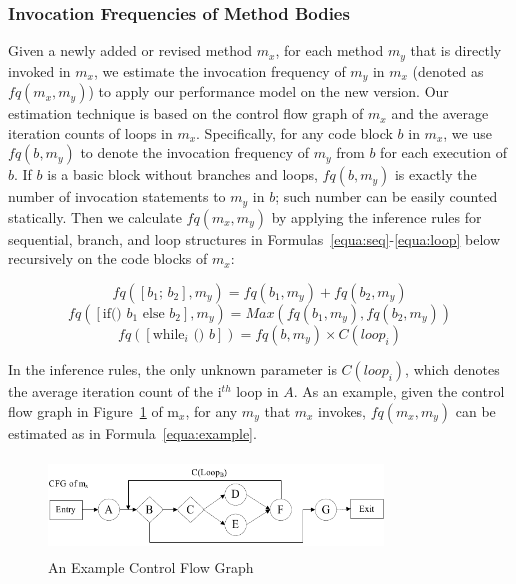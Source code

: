 \subsubsection{Invocation Frequencies of Method Bodies}

Given a newly added or revised method $m_x$, for each method $m_y$ that is directly invoked in $m_x$, we estimate the invocation frequency of $m_y$ in $m_x$ (denoted as $fq(m_x, m_y)$) to apply our performance model on the new version. Our estimation technique is based on the control flow graph of $m_x$ and the average iteration counts of loops in $m_x$. Specifically, for any code block $b$ in $m_x$, we use $fq(b, m_y)$ to denote the invocation frequency of $m_y$ from $b$ for each execution of $b$. If $b$ is a basic block without branches and loops, $fq(b, m_y)$ is exactly the number of invocation statements to $m_y$ in $b$; such number can be easily counted statically. Then we calculate $fq(m_x, m_y)$ by applying the inference rules for sequential, branch, and loop structures in Formulas~\ref{equa:seq}-\ref{equa:loop} below recursively on the code blocks of $m_x$:

   
\begin{equation}
\label{equa:seq}
fq([\text{$b_1$; $b_2$}], m_y) = fq(b_1, m_y) + fq(b_2, m_y)
\end{equation}
\begin{equation}
\label{equa:branch}
fq([\text{if() $b_1$ else $b_2$}], m_y) = Max(fq(b_1, m_y), fq(b_2, m_y))
\end{equation}
\begin{equation}
\label{equa:loop}
fq([\text{while$_i$ () $b$}]) = fq(b, m_y) \times C(loop_i)
\end{equation}

In the inference rules, the only unknown parameter is $C(loop_i)$, which denotes the average iteration count of the i$^{th}$ loop in $A$. As an example, given the control flow graph in Figure~\ref{fig:cfg-sample} of m$_x$, for any $m_y$ that $m_x$ invokes, $fq(m_x, m_y)$ can be estimated as in Formula~\ref{equa:example}.

\begin{figure}
\centering
	\includegraphics[width=3.5in, height=1in]{performance/images/cfg-new.pdf}
	
	\caption{An Example Control Flow Graph}	
	
	\label{fig:cfg-sample}
\end{figure}


